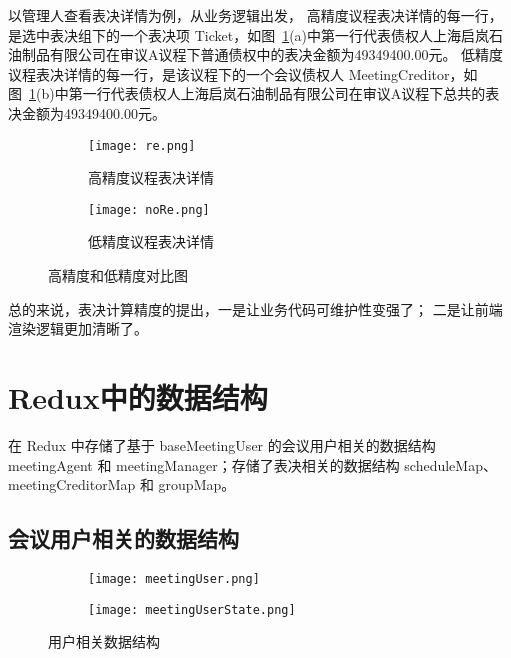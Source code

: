   以管理人查看表决详情为例，从业务逻辑出发，
  高精度议程表决详情的每一行，是选中表决组下的一个表决项 Ticket，如图~\ref{fig:reAndNoRe}(a)中第一行代表债权人上海启岚石油制品有限公司在审议A议程下普通债权中的表决金额为49349400.00元。
  低精度议程表决详情的每一行，是该议程下的一个会议债权人 MeetingCreditor，如图~\ref{fig:reAndNoRe}(b)中第一行代表债权人上海启岚石油制品有限公司在审议A议程下总共的表决金额为49349400.00元。

  \begin{figure}[!htp]
    \centering
    \begin{subfigure}{0.45\textwidth}
      \centering
      \texttt{[image: re.png]}
      \caption{高精度议程表决详情}
    \end{subfigure}
    \hspace{1cm}
    \begin{subfigure}{0.45\textwidth}
      \centering
      \texttt{[image: noRe.png]}
      \caption{低精度议程表决详情}
    \end{subfigure}
    \caption{高精度和低精度对比图}
    \label{fig:reAndNoRe}
  \end{figure}

  总的来说，表决计算精度的提出，一是让业务代码可维护性变强了；
  二是让前端渲染逻辑更加清晰了。

  \section{Redux中的数据结构}

  在 Redux 中存储了基于 baseMeetingUser 的会议用户相关的数据结构 meetingAgent 和 meetingManager；存储了表决相关的数据结构 scheduleMap、meetingCreditorMap 和 groupMap。

  \subsection{会议用户相关的数据结构}

  \begin{figure}[!htp]
    \centering
    \begin{subfigure}{0.6\textwidth}
      \centering
      \texttt{[image: meetingUser.png]}
      \caption{}
    \end{subfigure}
    \hspace{1cm}
    \begin{subfigure}{0.3\textwidth}
      \centering
      \texttt{[image: meetingUserState.png]}
      \caption{}
    \end{subfigure}
    \caption{用户相关数据结构}
    \label{fig:meetingUser}
  \end{figure}

